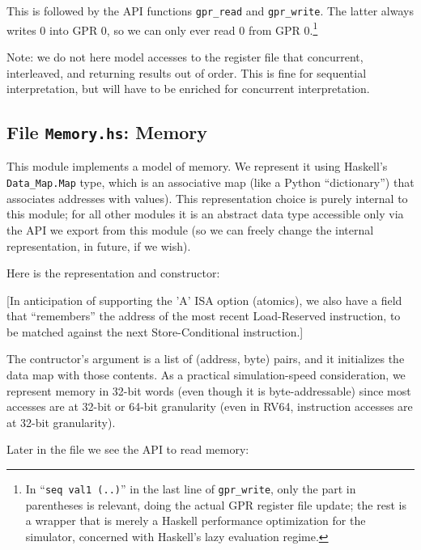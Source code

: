 \documentclass[11pt]{article}
\begin{document}
This is followed by the API functions \verb|gpr_read| and
\verb|gpr_write|.  The latter always writes 0 into GPR 0, so we can
only ever read 0 from GPR 0.\footnote{In ``{\tt seq~val1~(..)}'' in
the last line of {\tt gpr\_write}, only the part in parentheses is
relevant, doing the actual GPR register file update; the rest is a
wrapper that is merely a Haskell performance optimization for the
simulator, concerned with Haskell's lazy evaluation regime.}

Note: we do not here model accesses to the register file that
concurrent, interleaved, and returning results out of order.  This is
fine for sequential interpretation, but will have to be enriched for
concurrent interpretation.


\subsection{File {\tt Memory.hs}: Memory}

\label{sec_memory}

This module implements a model of memory.  We represent it using
Haskell's \verb|Data_Map.Map| type, which is an associative map (like
a Python ``dictionary'') that associates addresses with values).  This
representation choice is purely internal to this module; for all other
modules it is an abstract data type accessible only via the API we
export from this module (so we can freely change the internal
representation, in future, if we wish).

Here is the representation and constructor:



[In anticipation of supporting the 'A' ISA option (atomics), we also
have a field that ``remembers'' the address of the most recent
Load-Reserved instruction, to be matched against the next
Store-Conditional instruction.]

The contructor's argument is a list of (address, byte) pairs, and it
initializes the data map with those contents.  As a practical
simulation-speed consideration, we represent memory in 32-bit words
(even though it is byte-addressable) since most accesses are at 32-bit
or 64-bit granularity (even in RV64, instruction accesses are at
32-bit granularity).

Later in the file we see the API to read memory:


\end{document}

